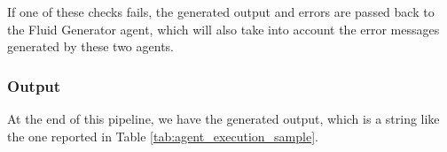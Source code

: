 If one of these checks fails, the generated output and errors are passed back to the Fluid Generator agent, which will also take into account the error messages generated by these two agents.

\subsubsection{Output}

At the end of this pipeline, we have the generated output, which is a string like the one reported in Table \ref{tab:agent_execution_sample}.
